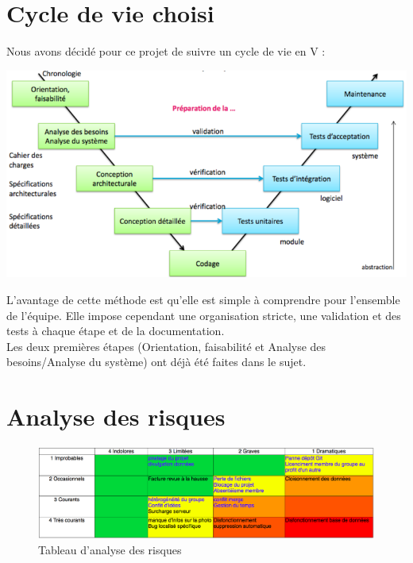 \documentclass{article}
\begin{document}
\begin{flushleft}
\section{Cycle de vie choisi}

Nous avons décidé pour ce projet de suivre un cycle de vie en V :\\
\vspace{1\baselineskip}
\vspace{1\baselineskip}
\begin{minipage}{0.55\linewidth}
  \begin{center}
    \includegraphics[scale=0.3]{fig5}
  \end{center}
\end{minipage}\hfill
\begin{minipage}{0.4\linewidth}
L'avantage de cette méthode est qu'elle est simple à comprendre pour
l'ensemble de l'équipe. Elle impose cependant une organisation stricte,
une validation et des tests à chaque étape et de la documentation.\\
Les deux premières étapes (Orientation, faisabilité et Analyse des
besoins/Analyse du système) ont déjà été faites dans le sujet.
\end{minipage}


\newpage

\section{Analyse des risques}

\begin{figure}[h]
  \begin{center}
    \includegraphics[scale=0.3]{fig3} %
    \caption{Tableau d'analyse des risques}
  \end{center}
\end{figure}


\end{flushleft}
\end{document}
